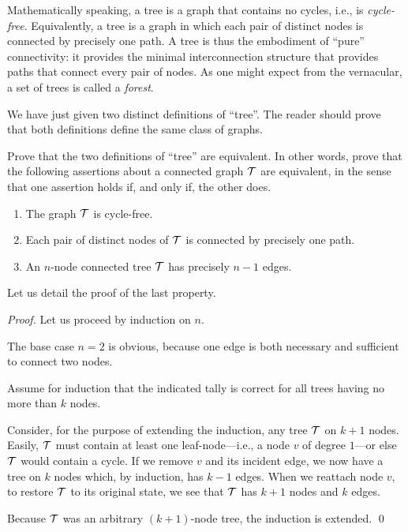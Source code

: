 Mathematically speaking, a tree is a graph that contains no cycles,
i.e., is {\it cycle-free}.  Equivalently, a
tree is a graph in which each pair of distinct nodes is connected by
precisely one path.  A tree is thus the embodiment of ``pure''
connectivity: it provides the minimal interconnection structure that
provides paths that connect every pair of nodes.  As one might expect
from the vernacular, a set of trees is called a {\it forest}. 

We have just given two distinct definitions of ``tree''.  The reader
should prove that both definitions define the same class of graphs.

\begin{prop}
\label{thm:2defns-trees}
Prove that the two definitions of ``tree'' are equivalent.  In other
words, prove that the following assertions about a connected graph
$\mbox{$\cal T$}$ are equivalent, in the sense that one assertion holds if, and
only if, the other does.
\begin{enumerate}
\item
The graph $\mbox{$\cal T$}$ is cycle-free.
\item
Each pair of distinct nodes of $\mbox{$\cal T$}$ is connected by precisely one
path.
\item
An $n$-node connected tree $\mbox{$\cal T$}$ has precisely $n-1$ edges.
\end{enumerate}
\end{prop}

Let us detail the proof of the last property.

\begin{proof}
\noindent 
Let us proceed by induction on $n$.

The base case $n=2$ is obvious, because one edge is both necessary and
sufficient to connect two nodes.

Assume for induction that the indicated tally is correct for all trees
having no more than $k$ nodes.

Consider, for the purpose of extending the induction, any tree $\mbox{$\cal T$}$ on
$k+1$ nodes.  Easily, $\mbox{$\cal T$}$ must contain at least one leaf-node---i.e.,
a node $v$ of degree $1$---or else $\mbox{$\cal T$}$ would contain a cycle.  If we
remove $v$ and its incident edge, we now have a tree on $k$ nodes
which, by induction, has $k-1$ edges.  When we reattach node $v$, to
restore $\mbox{$\cal T$}$ to its original state, we see that $\mbox{$\cal T$}$ has $k+1$ nodes
and $k$ edges.

Because $\mbox{$\cal T$}$ was an arbitrary $(k+1)$-node tree, the induction is
extended.  \qed
\end{proof}

